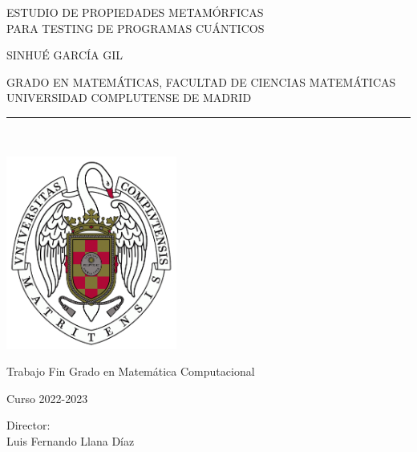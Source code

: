 \newpage

\thispagestyle{empty}


\begin{center}

   \vspace{5cm}

   {\Large ESTUDIO DE PROPIEDADES METAMÓRFICAS\\ 
   \vspace{0.35cm}
   PARA TESTING DE PROGRAMAS CUÁNTICOS}\\

   \vspace{0.5cm}

   \vspace{0.5cm}

   {\large SINHUÉ GARCÍA GIL}\\

   \vspace{1cm}


   GRADO EN MATEMÁTICAS, FACULTAD DE CIENCIAS MATEMÁTICAS\\
   \vspace{0.1cm}
   UNIVERSIDAD COMPLUTENSE DE MADRID \\


   \vspace{0.65cm}
   \rule{2in}{0.5pt}\\
   \vspace{0.85cm}
   
   \includegraphics[height=2.5in]{imagenes/escudo.png}
  

   \vspace{0.5cm}
Trabajo Fin Grado en Matemática Computacional

   \vspace{0.5cm}


  Curso 2022-2023
   \vspace{1cm}

\end{center}

{\raggedleft
Director:\\
   \vspace{0.5cm}
Luis Fernando Llana Díaz\\
}